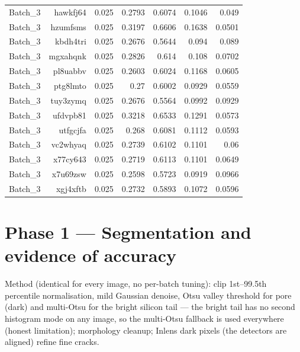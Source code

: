 \documentclass[11pt,a4paper]{article}
\begin{document}
\begin{longtable}{lrrrrrr}
Batch\_3 & hawkfj64 & 0.025 & 0.2793 & 0.6074 & 0.1046 & 0.049 \\
Batch\_3 & hzumfsms & 0.025 & 0.3197 & 0.6606 & 0.1638 & 0.0501 \\
Batch\_3 & kbdh4tri & 0.025 & 0.2676 & 0.5644 & 0.094 & 0.089 \\
Batch\_3 & mgxahqnk & 0.025 & 0.2826 & 0.614 & 0.108 & 0.0702 \\
Batch\_3 & pl8uabbv & 0.025 & 0.2603 & 0.6024 & 0.1168 & 0.0605 \\
Batch\_3 & ptg8lmto & 0.025 & 0.27 & 0.6002 & 0.0929 & 0.0559 \\
Batch\_3 & tuy3zymq & 0.025 & 0.2676 & 0.5564 & 0.0992 & 0.0929 \\
Batch\_3 & ufdvpb81 & 0.025 & 0.3218 & 0.6533 & 0.1291 & 0.0573 \\
Batch\_3 & utfgcjfa & 0.025 & 0.268 & 0.6081 & 0.1112 & 0.0593 \\
Batch\_3 & vc2whyaq & 0.025 & 0.2739 & 0.6102 & 0.1101 & 0.06 \\
Batch\_3 & x77cy643 & 0.025 & 0.2719 & 0.6113 & 0.1101 & 0.0649 \\
Batch\_3 & x7u69zsw & 0.025 & 0.2598 & 0.5723 & 0.0919 & 0.0966 \\
Batch\_3 & xgj4xftb & 0.025 & 0.2732 & 0.5893 & 0.1072 & 0.0596 \\
\end{longtable}
\normalsize
\newpage


\section{Phase 1 --- Segmentation and evidence of accuracy}
Method (identical for every image, no per-batch tuning): clip 1st--99.5th
percentile normalisation, mild Gaussian denoise, Otsu valley threshold for
pore (dark) and multi-Otsu for the bright silicon tail --- the bright tail
has no second histogram mode on any image, so the multi-Otsu fallback is used
everywhere (honest limitation); morphology cleanup; Inlens dark pixels (the
detectors are aligned) refine fine cracks.
\end{document}
